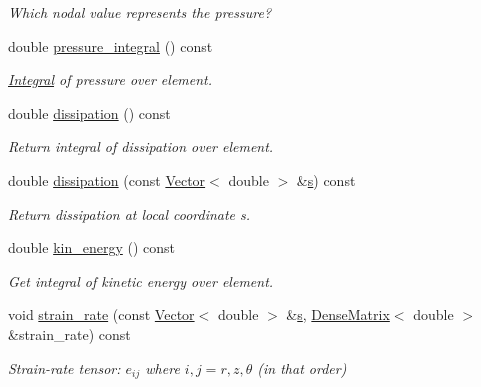 \begin{DoxyCompactItemize}
\begin{DoxyCompactList}\small\item\em Which nodal value represents the pressure? \end{DoxyCompactList}\item 
double \hyperlink{classoomph_1_1AxisymmetricNavierStokesEquations_a056e6c406e93a62763a0ac8912ce9e1b}{pressure\+\_\+integral} () const
\begin{DoxyCompactList}\small\item\em \hyperlink{classoomph_1_1Integral}{Integral} of pressure over element. \end{DoxyCompactList}\item 
double \hyperlink{classoomph_1_1AxisymmetricNavierStokesEquations_a002f84742337fbf2dcba83866b1d089e}{dissipation} () const
\begin{DoxyCompactList}\small\item\em Return integral of dissipation over element. \end{DoxyCompactList}\item 
double \hyperlink{classoomph_1_1AxisymmetricNavierStokesEquations_a17b8b46a8ebbb5d75486077c960d5844}{dissipation} (const \hyperlink{classoomph_1_1Vector}{Vector}$<$ double $>$ \&\hyperlink{cfortran_8h_ab7123126e4885ef647dd9c6e3807a21c}{s}) const
\begin{DoxyCompactList}\small\item\em Return dissipation at local coordinate s. \end{DoxyCompactList}\item 
double \hyperlink{classoomph_1_1AxisymmetricNavierStokesEquations_a823b3494f75b435cf8d0fbe5572937a8}{kin\+\_\+energy} () const
\begin{DoxyCompactList}\small\item\em Get integral of kinetic energy over element. \end{DoxyCompactList}\item 
void \hyperlink{classoomph_1_1AxisymmetricNavierStokesEquations_ad12929a11d71f7d91627f3edc8f2cdce}{strain\+\_\+rate} (const \hyperlink{classoomph_1_1Vector}{Vector}$<$ double $>$ \&\hyperlink{cfortran_8h_ab7123126e4885ef647dd9c6e3807a21c}{s}, \hyperlink{classoomph_1_1DenseMatrix}{Dense\+Matrix}$<$ double $>$ \&strain\+\_\+rate) const
\begin{DoxyCompactList}\small\item\em Strain-\/rate tensor\+: $ e_{ij} $ where $ i,j = r,z,\theta $ (in that order) \end{DoxyCompactList}\item 

\end{DoxyCompactItemize}
